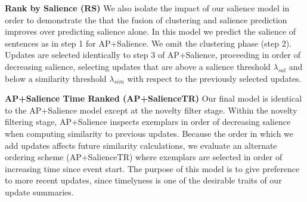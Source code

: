 \textbf{Rank by Salience (RS)} 
We also isolate the impact of our salience model in order to demonstrate 
the that the fusion of clustering and salience prediction improves over
predicting salience alone.
In this model we predict the salience of sentences as in step 1 for 
AP+Salience. %
We omit the clustering phase (step 2).
Updates are selected identically to step 3 of AP+Salience, proceeding 
in order of decreasing salience, selecting updates that are above a salience 
threshold $\lambda_{sal}$ and below a similarity threshold $\lambda_{sim}$
with respect to the previously selected updates.


\textbf{AP+Salience Time Ranked (AP+SalienceTR)} Our final model is identical 
to the
AP+Salience model except at the novelty filter stage.
Within the novelty filtering stage, 
AP+Salience inspects exemplars in order of decreasing salience when computing
similarity to previous updates. Because the order in which we add updates
affects future similarity calculations, we evaluate an alternate ordering 
scheme (AP+SalienceTR) where exemplars are selected in order of increasing 
time since event start. The purpose of this model is to give preference to 
more recent updates, since timelyness is one of the desirable traits of our update
summaries.

